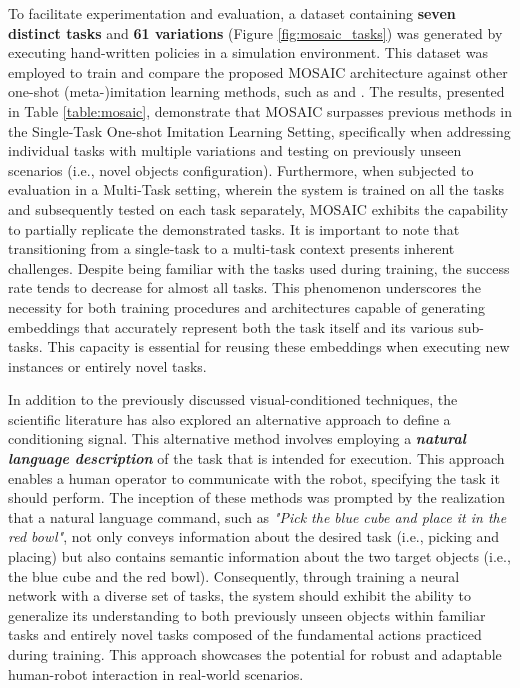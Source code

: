 To facilitate experimentation and evaluation, a dataset containing \textbf{seven distinct tasks} and \textbf{61 variations} (Figure \ref{fig:mosaic_tasks}) was generated by executing hand-written policies in a simulation environment. This dataset was employed to train and compare the proposed MOSAIC architecture against other one-shot (meta-)imitation learning methods, such as \cite{yu2018daml} and \cite{dasari2021transformers_one_shot}. The results, presented in Table \ref{table:mosaic}, demonstrate that MOSAIC surpasses previous methods in the Single-Task One-shot Imitation Learning Setting, specifically when addressing individual tasks with multiple variations and testing on previously unseen scenarios (i.e., novel objects configuration).
Furthermore, when subjected to evaluation in a Multi-Task setting, wherein the system is trained on all the tasks and subsequently tested on each task separately, MOSAIC exhibits the capability to partially replicate the demonstrated tasks. It is important to note that transitioning from a single-task to a multi-task context presents inherent challenges. Despite being familiar with the tasks used during training, the success rate tends to decrease for almost all tasks. This phenomenon underscores the necessity for both training procedures and architectures capable of generating embeddings that accurately represent both the task itself and its various sub-tasks. This capacity is essential for reusing these embeddings when executing new instances or entirely novel tasks.


In addition to the previously discussed visual-conditioned techniques, the scientific literature has also explored an alternative approach to define a conditioning signal. This alternative method involves employing a \textit{\textbf{natural language description}} of the task that is intended for execution. This approach enables a human operator to communicate with the robot, specifying the task it should perform. The inception of these methods was prompted by the realization that a natural language command, such as \textit{"Pick the blue cube and place it in the red bowl"}, not only conveys information about the desired task (i.e., picking and placing) but also contains semantic information about the two target objects (i.e., the blue cube and the red bowl). Consequently, through training a neural network with a diverse set of tasks, the system should exhibit the ability to generalize its understanding to both previously unseen objects within familiar tasks and entirely novel tasks composed of the fundamental actions practiced during training. This approach showcases the potential for robust and adaptable human-robot interaction in real-world scenarios.

